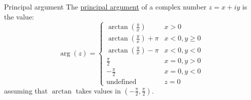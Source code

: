 \documentclass[../Main.tex]{subfiles}
\begin{document}
\begin{definition}{Principal argument}
    The \underline{principal argument} of a complex number $z = x + i y$ is the value:
    \begin{equation*}
        \arg(z) =
        \begin{cases}
            \arctan\left(\frac{y}{x}\right) & x > 0 \\
            \arctan\left(\frac{y}{x}\right) + \pi & x < 0, y \geq 0 \\
            \arctan\left(\frac{y}{x}\right) - \pi & x < 0, y < 0 \\
            \frac\pi2 & x = 0, y > 0 \\
            -\frac\pi2 & x = 0, y < 0 \\
            \text{undefined} & z = 0
        \end{cases}
    \end{equation*}
    assuming that $\arctan$ takes values in $\left(-\frac{\pi}{2}, \frac{\pi}{2}\right)$.
\end{definition}
\end{document}
